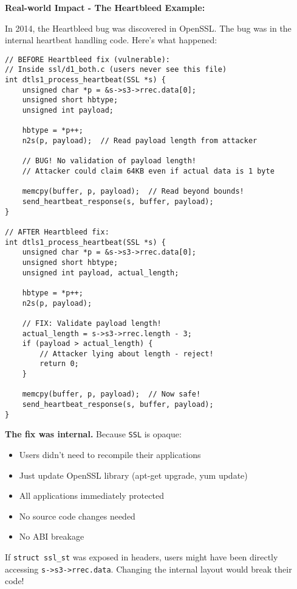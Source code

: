 \textbf{Real-world Impact - The Heartbleed Example:}

In 2014, the Heartbleed bug was discovered in OpenSSL. The bug was in the internal heartbeat handling code. Here's what happened:

\begin{lstlisting}
// BEFORE Heartbleed fix (vulnerable):
// Inside ssl/d1_both.c (users never see this file)
int dtls1_process_heartbeat(SSL *s) {
    unsigned char *p = &s->s3->rrec.data[0];
    unsigned short hbtype;
    unsigned int payload;

    hbtype = *p++;
    n2s(p, payload);  // Read payload length from attacker

    // BUG! No validation of payload length!
    // Attacker could claim 64KB even if actual data is 1 byte

    memcpy(buffer, p, payload);  // Read beyond bounds!
    send_heartbeat_response(s, buffer, payload);
}

// AFTER Heartbleed fix:
int dtls1_process_heartbeat(SSL *s) {
    unsigned char *p = &s->s3->rrec.data[0];
    unsigned short hbtype;
    unsigned int payload, actual_length;

    hbtype = *p++;
    n2s(p, payload);

    // FIX: Validate payload length!
    actual_length = s->s3->rrec.length - 3;
    if (payload > actual_length) {
        // Attacker lying about length - reject!
        return 0;
    }

    memcpy(buffer, p, payload);  // Now safe!
    send_heartbeat_response(s, buffer, payload);
}
\end{lstlisting}

\textbf{The fix was internal.} Because \texttt{SSL} is opaque:

\begin{itemize}
    \item Users didn't need to recompile their applications
    \item Just update OpenSSL library (apt-get upgrade, yum update)
    \item All applications immediately protected
    \item No source code changes needed
    \item No ABI breakage
\end{itemize}

If \texttt{struct ssl\_st} was exposed in headers, users might have been directly accessing \texttt{s->s3->rrec.data}. Changing the internal layout would break their code!

